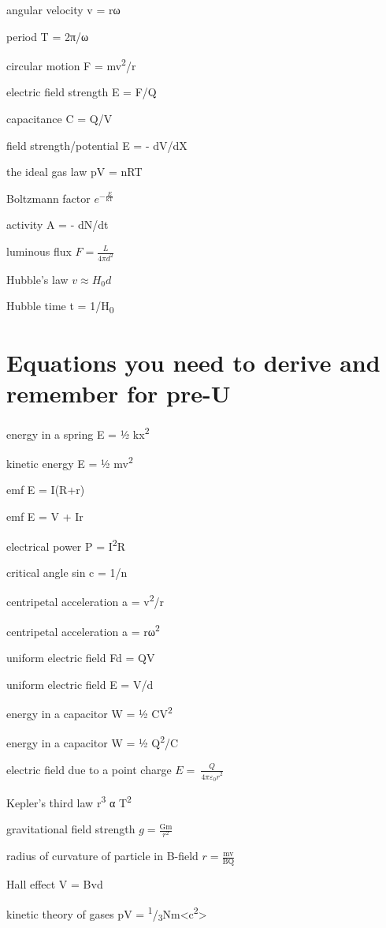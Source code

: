 \documentclass[main.tex]{subfiles}
\begin{document}
angular velocity v = rω

period T = 2π/ω

circular motion F = mv\textsuperscript{2}/r

electric field strength E = F/Q

capacitance C = Q/V

field strength/potential E = - dV/dX

the ideal gas law pV = nRT

Boltzmann factor \(e^{- \frac{E}{\text{kT}}}\)

activity A = - dN/dt

luminous flux \(F = \frac{L}{4\pi d^{2}}\)

Hubble's law \(v \approx H_{0}d\)

Hubble time t = 1/H\textsubscript{0}

\section{Equations you need to derive and remember for pre-U}

energy in a spring E = ½ kx\textsuperscript{2}

kinetic energy E = ½ mv\textsuperscript{2}

emf E = I(R+r)

emf E = V + Ir

electrical power P = I\textsuperscript{2}R

critical angle sin c = 1/n

centripetal acceleration a = v\textsuperscript{2}/r

centripetal acceleration a = rω\textsuperscript{2}

uniform electric field Fd = QV

uniform electric field E = V/d

energy in a capacitor W = ½ CV\textsuperscript{2 }

energy in a capacitor W = ½ Q\textsuperscript{2}/C

electric field due to a point charge
\(E = \ \frac{Q}{{4\pi\varepsilon_{0}r}^{2}}\)

Kepler's third law r\textsuperscript{3} α T\textsuperscript{2}

gravitational field strength \(g = \frac{\text{Gm}}{r^{2}}\)

radius of curvature of particle in B-field
\(r = \frac{\text{mv}}{\text{BQ}}\)

Hall effect V = Bvd

kinetic theory of gases pV =
\textsuperscript{1}/\textsubscript{3}Nm\textless{}c\textsuperscript{2}\textgreater{}
\end{document}

